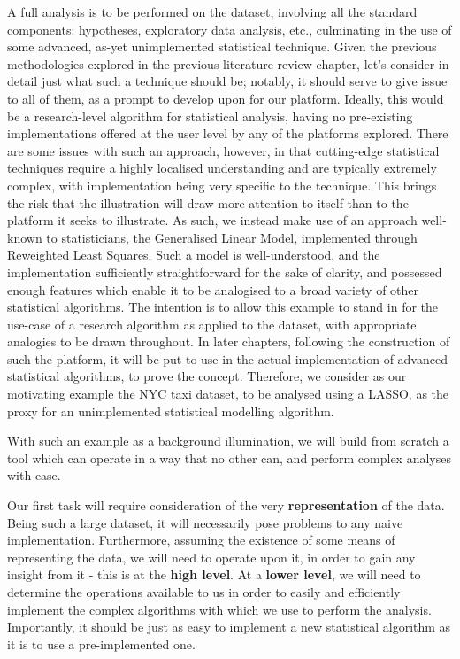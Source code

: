 A full analysis is to be performed on the dataset, involving all the standard components: hypotheses, exploratory data analysis, etc., culminating in the use of some advanced, as-yet unimplemented statistical technique.
Given the previous methodologies explored in the previous literature review chapter, let's consider in detail just what such a technique should be; notably, it should serve to give issue to all of them, as a prompt to develop upon for our platform.
Ideally, this would be a research-level algorithm for statistical analysis, having no pre-existing implementations offered at the user level by any of the platforms explored.
There are some issues with such an approach, however, in that cutting-edge statistical techniques require a highly localised understanding and are typically extremely complex, with implementation being very specific to the technique.
This brings the risk that the illustration will draw more attention to itself than to the platform it seeks to illustrate.
As such, we instead make use of an approach well-known to statisticians, the Generalised Linear Model, implemented through Reweighted Least Squares.
Such a model is well-understood, and the implementation sufficiently straightforward for the sake of clarity, and possessed enough features which enable it to be analogised to a broad variety of other statistical algorithms.
The intention is to allow this example to stand in for the use-case of a research algorithm as applied to the dataset, with appropriate analogies to be drawn throughout.
In later chapters, following the construction of such the platform, it will be put to use in the actual implementation of advanced statistical algorithms, to prove the concept.
Therefore, we consider as our motivating example the NYC taxi dataset, to be analysed using a LASSO, as the proxy for an unimplemented statistical modelling algorithm.

With such an example as a background illumination, we will build from scratch a tool which can operate in a way that no other can, and perform complex analyses with ease.

Our first task will require consideration of the very \textbf{representation} of the data.
Being such a large dataset, it will necessarily pose problems to any naive implementation.
Furthermore, assuming the existence of some means of representing the data, we will need to operate upon it, in order to gain any insight from it - this is at the \textbf{high level}.
At a \textbf{lower level}, we will need to determine the operations available to us in order to easily and efficiently implement the complex algorithms with which we use to perform the analysis.
Importantly, it should be just as easy to implement a new statistical algorithm as it is to use a pre-implemented one.

